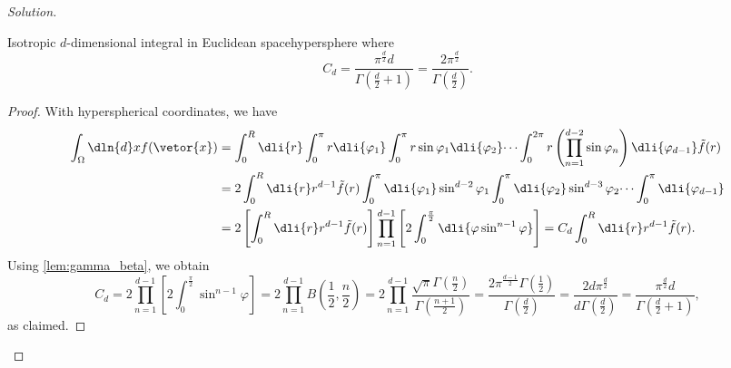 \begin{proof}[Solution]
\begin{lemma}{Isotropic \(d\)-dimensional integral in Euclidean space}{hypersphere}
      where
      \begin{equation*}
         C_d = \frac{\pi^{\frac{d}{2}}d}{\Gamma(\frac{d}{2}+1)} = \frac{2 \pi^{\frac{d}{2}}}{\Gamma\left(\frac{d}{2}\right)}.
      \end{equation*}
   \end{lemma}
   \begin{proof}
      With hyperspherical coordinates, we have
      \begin{align*}
         \int_{\Omega} \dln{d}xf(\vetor{x}) 
      &= \int_0^R \dli{r} \int_0^{\pi} r \dli{\varphi_1} \int_0^{\pi} r\sin\varphi_1 \dli{\varphi_2} \dots \int_0^{2\pi} r \left(\prod_{n = 1}^{d-2} \sin\varphi_n\right)\dli{\varphi_{d-1}} \tilde{f}(r)\\
      &= 2\int_{0}^R \dli{r} r^{d-1} \tilde{f}(r) \int_0^\pi \dli{\varphi_1} \sin^{d-2}\varphi_1 \int_0^\pi \dli{\varphi_2}\sin^{d - 3}\varphi_2 \dots \int_0^\pi \dli{\varphi_{d-1}}\\
        &= 2\left[\int_0^R \dli{r} r^{d-1} \tilde{f}(r)\right] \prod_{n=1}^{d-1} \left[2\int_0^{\frac{\pi}{2}}\dli{\varphi \sin^{n-1}\varphi}\right] = C_d \int_0^R \dli{r} r^{d-1} \tilde{f}(r).
   \end{align*}
   Using \cref{lem:gamma_beta}, we obtain
   \begin{equation*}
      C_d = 2 \prod_{n=1}^{d-1} \left[2 \int_0^{\frac{\pi}{2}} \sin^{n - 1}\varphi\right] = 2 \prod_{n = 1}^{d - 1}{B\left(\frac12,\frac{n}{2}\right)} =  2\prod_{n=1}^{d-1}\frac{\sqrt{\pi} \Gamma(\frac{n}{2})}{\Gamma(\frac{n+1}{2})} = \frac{2 \pi^{\frac{d-1}{2}}\Gamma(\frac12)}{\Gamma(\frac{d}{2})} = \frac{2d \pi^{\frac{d}{2}}}{d \Gamma(\frac{d}{2})} = \frac{\pi^{\frac{d}{2}}d}{\Gamma(\frac{d}{2} + 1)},
   \end{equation*}
   as claimed.
   \end{proof}


\end{proof}
